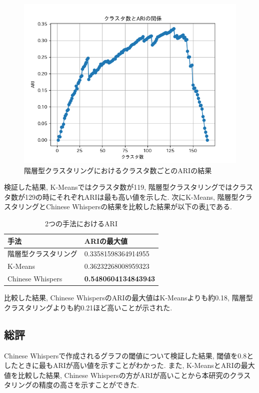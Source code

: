 \begin{figure}[hbtp]
  \centering
  \includegraphics[scale=0.8]
    {contents/images/agg_graph.png}
  \caption{階層型クラスタリングにおけるクラスタ数ごとのARIの結果\label{fig:agg_graph}}
\end{figure}

検証した結果, K-Meansではクラスタ数が119, 階層型クラスタリングではクラスタ数が129の時にそれぞれARIは最も高い値を示した. 次にK-Means, 階層型クラスタリングとChinese Whispersの結果を比較した結果が以下の表\ref{tb:two_ari}である. 

\begin{table}[htbp]
  \caption{2つの手法におけるARI}
  \label{tb:two_ari}
  \begin{center}
  \begin{tabularx}{\linewidth}{|X|X|}
    \hline
    手法&ARIの最大値\\\hline\hline
    階層型クラスタリング&0.33581598364914955\\\hline
    K-Means&0.36232268008959323\\\hline
    Chinese Whispers&\textbf{0.5480604134843943}\\\hline
  \end{tabularx}\end{center}
\end{table}

比較した結果, Chinese WhispersのARIの最大値はK-Meansよりも約0.18, 階層型クラスタリングよりも約0.21ほど高いことが示された. 

\subsection{総評}
Chinese Whispersで作成されるグラフの閾値について検証した結果, 閾値を0.8としたときに最もARIが高い値を示すことがわかった. 
また, K-MeansとARIの最大値を比較した結果, Chinese Whispersの方がARIが高いことから本研究のクラスタリングの精度の高さを示すことができた. 

